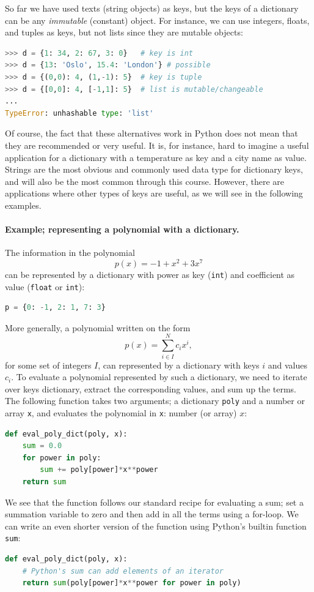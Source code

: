 \documentclass[graybox,envcountchap,sectrefs,final]{svmonodo}
\begin{document}
So far we have used texts (string objects) as keys, but the keys of a dictionary can be any \emph{immutable} (constant) object.
For instance, we can use integers, floats, and tuples as keys, but not lists since they are mutable objects:
\begin{lstlisting}[language=Python,style=blue1]
>>> d = {1: 34, 2: 67, 3: 0}   # key is int
>>> d = {13: 'Oslo', 15.4: 'London'} # possible
>>> d = {(0,0): 4, (1,-1): 5}  # key is tuple
>>> d = {[0,0]: 4, [-1,1]: 5}  # list is mutable/changeable
...
TypeError: unhashable type: 'list'
\end{lstlisting}
Of course, the fact that these alternatives work in Python does not mean that they are recommended or very useful.
It is, for instance, hard to imagine a useful application for a dictionary with a temperature as key and a
city name as value. Strings are the most obvious and commonly used data type for dictionary keys, and will also be
the most common through this course. However, there are applications where other types of keys are useful, as we
will see in the following examples.

\paragraph{Example; representing a polynomial with a dictionary.}
The information in the polynomial
\[ p(x)=-1 + x^2 + 3x^7 \]
can be represented by a dictionary with power as key (\texttt{int}) and
coefficient as value (\texttt{float} or   \texttt{int}):
\begin{lstlisting}[language=Python,style=blue1]
p = {0: -1, 2: 1, 7: 3}
\end{lstlisting}
More generally, a polynomial written on the form
\[
p(x) = \sum_{i\in I}^N c_i x^i ,
\]
for some set of integers $I$, can represented by a dictionary with keys $i$ and values $c_i$.
To evaluate a polynomial represented by such a dictionary, we need to iterate over keys dictionary, extract the
corresponding values, and sum up the terms. The following function takes two arguments; a dictionary \texttt{poly} and a number
or array \texttt{x}, and evaluates the polynomial in \texttt{x}:
number (or array) $x$:
\begin{lstlisting}[language=Python,style=blue1]
def eval_poly_dict(poly, x):
    sum = 0.0
    for power in poly:
        sum += poly[power]*x**power
    return sum
\end{lstlisting}
We see that the function follows our standard recipe for evaluating a sum;
set a summation variable to zero and then add in all the terms using a for-loop. We can write an even
shorter version of the function using Python's builtin function \texttt{sum}:
\begin{lstlisting}[language=Python,style=blue1]
def eval_poly_dict(poly, x):
    # Python's sum can add elements of an iterator
    return sum(poly[power]*x**power for power in poly)
\end{lstlisting}
\end{document}
